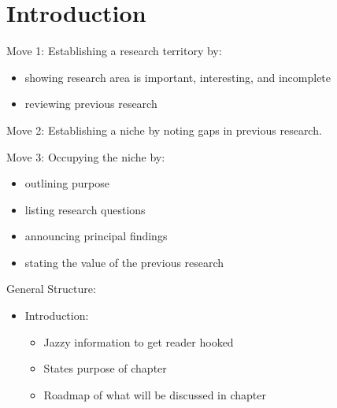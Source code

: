 \chapter{Introduction}
\label{chap:introduction}

\begin{writingdirectives}

      \item Move 1: Establishing a research territory by:
      \begin{itemize}

            \item showing research area is important, interesting, and
                  incomplete

            \item reviewing previous research

      \end{itemize}

      \item Move 2: Establishing a niche by noting gaps in previous research.

      \item Move 3: Occupying the niche by:
      \begin{itemize}

            \item outlining purpose

            \item listing research questions

            \item announcing principal findings

            \item stating the value of the previous research

      \end{itemize}

      \item General Structure:
      \begin{itemize}

            \item Introduction:
                  \begin{itemize}

                        \item Jazzy information to get reader hooked

                        \item States purpose of chapter

                        \item Roadmap of what will be discussed in chapter


\end{itemize}
\end{itemize}
\end{writingdirectives}

